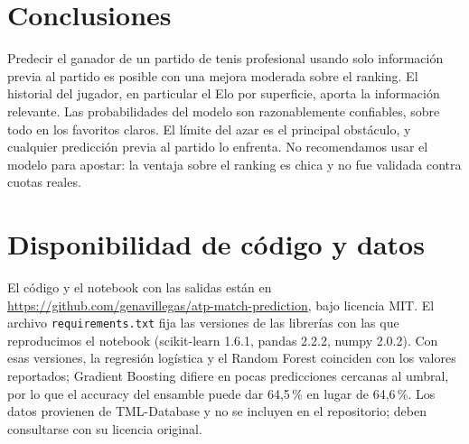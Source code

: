 \documentclass[11pt,a4paper]{article}
\begin{document}
\section{Conclusiones}

Predecir el ganador de un partido de tenis profesional usando solo información previa al partido es posible con una mejora moderada sobre el ranking. El historial del jugador, en particular el Elo por superficie, aporta la información relevante. Las probabilidades del modelo son razonablemente confiables, sobre todo en los favoritos claros. El límite del azar es el principal obstáculo, y cualquier predicción previa al partido lo enfrenta. No recomendamos usar el modelo para apostar: la ventaja sobre el ranking es chica y no fue validada contra cuotas reales.

\section*{Disponibilidad de código y datos}

El código y el notebook con las salidas están en \url{https://github.com/genavillegas/atp-match-prediction}, bajo licencia MIT. El archivo \texttt{requirements.txt} fija las versiones de las librerías con las que reproducimos el notebook (scikit-learn 1.6.1, pandas 2.2.2, numpy 2.0.2). Con esas versiones, la regresión logística y el Random Forest coinciden con los valores reportados; Gradient Boosting difiere en pocas predicciones cercanas al umbral, por lo que el accuracy del ensamble puede dar 64,5\,\% en lugar de 64,6\,\%. Los datos provienen de TML-Database \cite{tml2026} y no se incluyen en el repositorio; deben consultarse con su licencia original.



\end{document}
